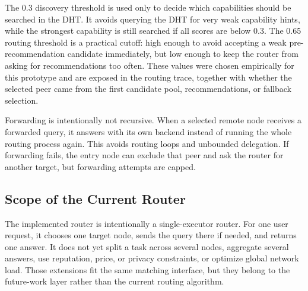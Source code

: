 The 0.3 discovery threshold is used only to decide which capabilities should be
searched in the DHT. It avoids querying the DHT for very weak capability hints,
while the strongest capability is still searched if all scores are below 0.3.
The 0.65 routing threshold is a practical cutoff: high enough to avoid accepting
a weak pre-recommendation candidate immediately, but low enough to keep the
router from asking for recommendations too often. These values were chosen
empirically for this prototype and are exposed in the routing trace, together
with whether the selected peer came from the first candidate pool,
recommendations, or fallback selection.

Forwarding is intentionally not recursive. When a selected remote node receives
a forwarded query, it answers with its own backend instead of running the whole
routing process again. This avoids routing loops and unbounded delegation. If
forwarding fails, the entry node can exclude that peer and ask the router for
another target, but forwarding attempts are capped.

\subsection{Scope of the Current Router}

The implemented router is intentionally a single-executor router. For one user
request, it chooses one target node, sends the query there if needed, and returns
one answer. It does not yet split a task across several nodes, aggregate several
answers, use reputation, price, or privacy constraints, or optimize global
network load. Those extensions fit the same matching interface, but they belong
to the future-work layer rather than the current routing algorithm.
